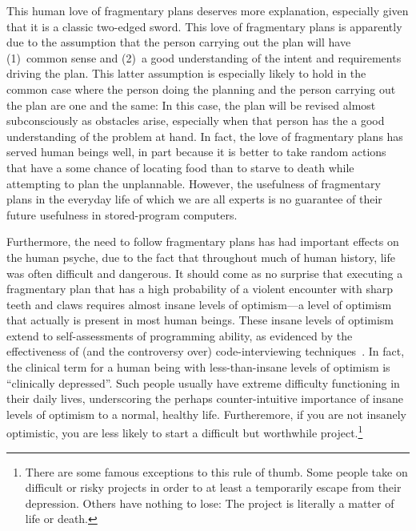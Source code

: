 This human love of fragmentary plans deserves more explanation,
especially given that it is a classic two-edged sword.
This love of fragmentary plans is apparently due to the assumption that
the person carrying out the plan will have (1)~common sense and (2)~a good
understanding of the intent and requirements driving the plan.
This latter assumption is especially likely to hold in the common case
where the person doing the planning and the person carrying out the plan
are one and the same:
In this case, the plan will be revised almost
subconsciously as obstacles arise, especially when that person has the
a good understanding of the problem at hand.
In fact, the love of fragmentary plans has served human beings well,
in part because it is better to take random actions that have a some
chance of locating food than to starve to death while attempting to plan
the unplannable.
However, the usefulness of fragmentary plans in the
everyday life of which we are all experts is no guarantee of their future
usefulness in stored-program computers.

Furthermore, the need to follow fragmentary plans has had important effects
on the human psyche, due to the fact
that throughout much of human history, life was often difficult and dangerous.
It should come as no surprise that executing a fragmentary plan that has
a high probability of a violent encounter with sharp teeth and claws
requires almost insane levels of optimism---a level of optimism that actually
is present in most human beings.
These insane levels of optimism extend to self-assessments of programming
ability, as evidenced by the effectiveness of (and the controversy over)
code-interviewing techniques~\cite{RegBraithwaite2007FizzBuzz}.
In fact, the clinical term for a human being with less-than-insane
levels of optimism is ``clinically depressed''.
Such people usually have extreme difficulty functioning in their daily
lives, underscoring the perhaps counter-intuitive importance of insane
levels of optimism to a normal, healthy life.
Furtheremore, if you are not insanely optimistic, you are less likely
to start a difficult but worthwhile project.\footnote{
	There are some famous exceptions to this rule of thumb.
	Some people take on difficult or risky projects in order to at
	least a temporarily escape from their depression.
	Others have nothing to lose:
	The project is literally a matter of life or death.}

\QuickQuizEnd

